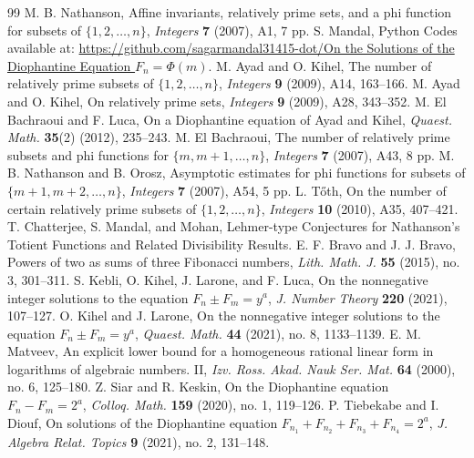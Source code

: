 \documentclass[10pt,a4paper]{amsart}
\begin{document}
\begin{thebibliography}{99}
 M. B. Nathanson, Affine invariants, relatively prime sets, and a phi function for subsets of $\{1,2,\dots,n\}$, \textit{Integers} \textbf{7} (2007), A1, 7 pp.
 S. Mandal, Python Codes available at: \href{https://github.com/sagarmandal31415-dot/On-the-Solutions-of-the-Diophantine-Equation-F_n-Phi-m-/tree/main}{https://github.com/sagarmandal31415-dot/On the Solutions of the Diophantine Equation $F_n=\Phi(m)$}.
 M. Ayad and O. Kihel, The number of relatively prime subsets of $\{1,2,\ldots,n\}$, \textit{Integers} \textbf{9} (2009), A14, 163–166.
 M. Ayad and O. Kihel, On relatively prime sets, \textit{Integers} \textbf{9} (2009), A28, 343–352.
 M. El Bachraoui and F. Luca, On a Diophantine equation of Ayad and Kihel, \textit{Quaest. Math.} \textbf{35}(2) (2012), 235–243.
 M. El Bachraoui, The number of relatively prime subsets and phi functions for $\{m,m+1,\dots,n\}$, \textit{Integers} \textbf{7} (2007), A43, 8 pp.
 M. B. Nathanson and B. Orosz, Asymptotic estimates for phi functions for subsets of $\{m+1,m+2,\dots,n\}$, \textit{Integers} \textbf{7} (2007), A54, 5 pp.
 L. T\H{o}th, On the number of certain relatively prime subsets of $\{1,2,\ldots,n\}$, \textit{Integers} \textbf{10} (2010), A35, 407–421.
 T. Chatterjee, S. Mandal, and Mohan, Lehmer-type Conjectures for Nathanson's Totient Functions and Related Divisibility Results.
 E. F. Bravo and J. J. Bravo, {Powers of two as sums of three Fibonacci numbers}, \emph{Lith. Math. J.} \textbf{55} (2015), no. 3, 301--311.
 S. Kebli, O. Kihel, J. Larone, and F. Luca, {On the nonnegative integer solutions to the equation $F_n\pm F_m=y^a$}, \emph{J. Number Theory} \textbf{220} (2021), 107--127.
 O. Kihel and J. Larone, {On the nonnegative integer solutions to the equation $F_n\pm F_m=y^a$}, \emph{Quaest. Math.} \textbf{44} (2021), no. 8, 1133--1139.
 E. M. Matveev, {An explicit lower bound for a homogeneous rational linear form in logarithms of algebraic numbers. II}, \emph{Izv. Ross. Akad. Nauk Ser. Mat.} \textbf{64} (2000), no. 6, 125--180.
 Z. Siar and R. Keskin, {On the Diophantine equation $F_n-F_m=2^a$}, \emph{Colloq. Math.} \textbf{159} (2020), no. 1, 119--126.
 P. Tiebekabe and I. Diouf, {On solutions of the Diophantine equation $F_{n_1}+F_{n_2}+F_{n_3}+F_{n_4}=2^a$}, \emph{J. Algebra Relat. Topics} \textbf{9} (2021), no. 2, 131--148.

\end{thebibliography}
\end{document}
